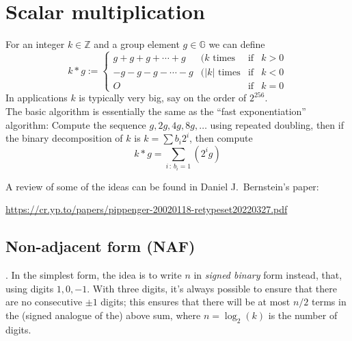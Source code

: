 \documentclass[12pt,draft,a4paper,openany,oneside]{amsbook}
\def\G{\mathbb{G}}
\def\Z{\mathbb{Z}}
\theoremstyle{plain}
\theoremstyle{definition}
\begin{document}

\section{Scalar multiplication}

For an integer $k\in \Z$ and a group element $g\in\G$ we can define
\[ k*g := \left\{\begin{array}{llll}
g+g+g+\cdots +g  &(k   \textrm{ times}&\textrm{if}& k > 0 \\
-g-g-g-\cdots -g &(|k| \textrm{ times}&\textrm{if}& k < 0 \\
O                &                    &\textrm{if}& k = 0
\end{array}
\right.
\]
In applications $k$ is typically very big, say on the order of $2^{256}$.\\

The basic algorithm is essentially the same as the ``fast exponentiation''
algorithm: Compute the sequence $g,2g,4g,8g,\dots$ using repeated doubling,
then if the binary decomposition of $k$ is $k=\sum b_i2^i$, then compute
\[ k*g = \sum_{i\,:\,b_i=1} (2^i g) \]

A review of some of the ideas can be found in Daniel J.~Bernstein's paper:

\noindent
\url{https://cr.yp.to/papers/pippenger-20020118-retypeset20220327.pdf}


\subsection{Non-adjacent form (NAF)}.
In the simplest form, the idea is to write $n$ in \emph{signed binary} form
instead, that, using digits $1,0,-1$. With three digits, it's always
possible to ensure that there are no consecutive $\pm 1$ digits; this ensures
that there will be at most $n/2$ terms in the (signed analogue of the) 
above sum, where $n=\log_2(k)$ is the number of digits.

\end{document}
